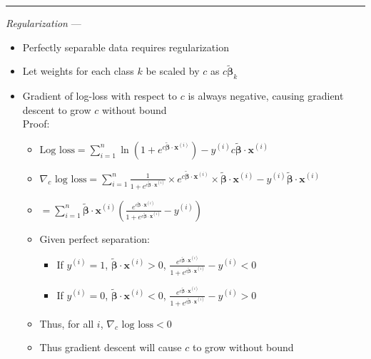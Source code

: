 {\color{lightgray}\hrule height 0.001mm}

\emph{Regularization} --- 
\begin{itemize}
    \item Perfectly separable data requires regularization
    \item Let weights for each class $k$ be scaled by $c$ as $c \boldsymbol{\tilde{\beta}}_k$
    \item Gradient of log-loss with respect to $c$ is always negative, causing gradient descent to grow $c$ without bound\\
    Proof:
    \begin{itemize}
        \item $\textrm{Log loss} = \sum_{i=1}^n \ln\left(1 + e^{c \boldsymbol{\tilde{\beta}} \cdot \boldsymbol{x}^{(i)}}\right) - y^{(i)} c \boldsymbol{\tilde{\beta}} \cdot \boldsymbol{x}^{(i)}$
        \item $\nabla_c \textrm{ log loss} = \sum_{i=1}^n \frac{1}{1 + e^{c \boldsymbol{\tilde{\beta}} \cdot \boldsymbol{x}^{(i)}}} \times e^{c \boldsymbol{\tilde{\beta}} \cdot \boldsymbol{x}^{(i)}} \times \boldsymbol{\tilde{\beta}} \cdot \boldsymbol{x}^{(i)} - y^{(i)} \boldsymbol{\tilde{\beta}} \cdot \boldsymbol{x}^{(i)}$
        \item $= \sum_{i=1}^n \boldsymbol{\tilde{\beta}} \cdot \boldsymbol{x}^{(i)} \left(\frac{e^{c \boldsymbol{\tilde{\beta}} \cdot \boldsymbol{x}^{(i)}}}{1 + e^{c \boldsymbol{\tilde{\beta}} \cdot \boldsymbol{x}^{(i)}}} - y^{(i)}\right)$
        \item Given perfect separation:
        \begin{itemize}
            \item If $y^{(i)} = 1$, $\boldsymbol{\tilde{\beta}} \cdot \boldsymbol{x}^{(i)} > 0$, $\frac{e^{c \boldsymbol{\tilde{\beta}} \cdot \boldsymbol{x}^{(i)}}}{1 + e^{c \boldsymbol{\tilde{\beta}} \cdot \boldsymbol{x}^{(i)}}} - y^{(i)} < 0$
            \item If $y^{(i)} = 0$, $\boldsymbol{\tilde{\beta}} \cdot \boldsymbol{x}^{(i)} < 0$, $\frac{e^{c \boldsymbol{\tilde{\beta}} \cdot \boldsymbol{x}^{(i)}}}{1 + e^{c \boldsymbol{\tilde{\beta}} \cdot \boldsymbol{x}^{(i)}}} - y^{(i)} > 0$
        \end{itemize}
        \item Thus, for all $i$, $\nabla_c \textrm{ log loss} < 0$
        \item Thus gradient descent will cause $c$ to grow without bound
    \end{itemize}
\end{itemize}